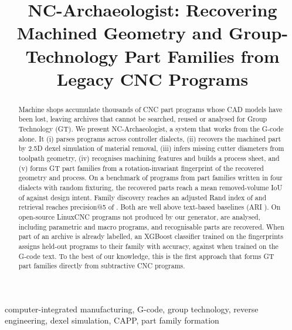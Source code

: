\documentclass[conference]{IEEEtran}
\begin{document}
\title{NC-Archaeologist: Recovering Machined Geometry and Group-Technology Part Families from Legacy CNC Programs}

\author{
}

\maketitle

\begin{abstract}
Machine shops accumulate thousands of CNC part programs whose CAD models have
been lost, leaving archives that cannot be searched, reused or analysed for
Group Technology (GT). We present NC-Archaeologist, a system that works from the
G-code alone. It (i) parses programs across controller dialects, (ii) recovers
the machined part by 2.5D dexel simulation of material removal, (iii) infers
missing cutter diameters from toolpath geometry, (iv) recognises machining
features and builds a process sheet, and (v) forms GT part families from a
rotation-invariant fingerprint of the recovered geometry and process. On a
benchmark of \NProg{} programs from \NFam{} part families written in four
dialects with random fixturing, the recovered parts reach a mean removed-volume
IoU of \RecAllIoU{} against design intent. Family discovery reaches an adjusted
Rand index of \FullARI{} and retrieval reaches precision@5 of \FullPATFIVE{}.
Both are well above text-based baselines (ARI \TextRawARI{}). On \RealN{}
open-source LinuxCNC programs not produced by our generator, \RealAnalysed{} are
analysed, including parametric and macro programs, and recognisable parts are
recovered. When part of an archive is already labelled, an XGBoost classifier
trained on the fingerprints assigns held-out programs to their family with
\XgbAcc{} accuracy, against \XgbTextAcc{} when trained on the G-code text. To
the best of our knowledge, this is the first approach that forms GT part
families directly from subtractive CNC programs.
\end{abstract}

\begin{IEEEkeywords}
computer-integrated manufacturing, G-code, group technology, reverse engineering, dexel simulation, CAPP, part family formation
\end{IEEEkeywords}
\end{document}
